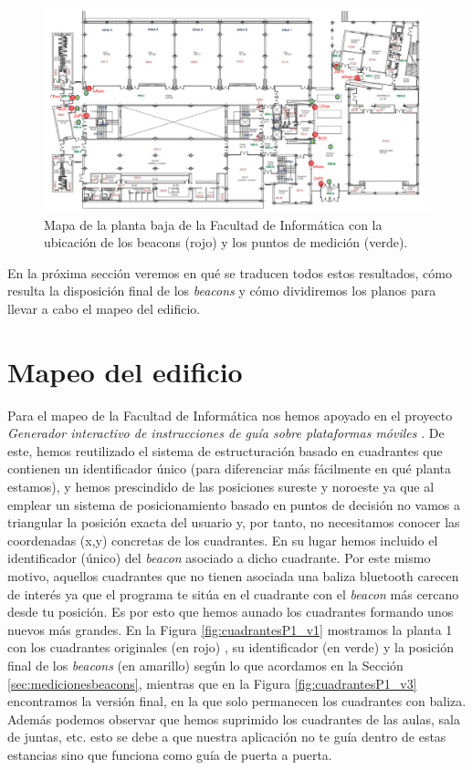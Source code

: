 \begin{figure}[t]
	\centering
	\includegraphics[width=1\textwidth]{Imagenes/Descripciondeltrabajo/medidasPlanoPBaja}
	\caption{Mapa de la planta baja de la Facultad de Informática con la ubicación de los beacons (rojo) y los puntos de medición (verde). }
	\label{fig:medidasPBaja}
\end{figure}

En la próxima sección veremos en qué se traducen todos estos resultados, cómo resulta la disposición final de los \textit{beacons} y cómo dividiremos los planos para llevar a cabo el mapeo del edificio.


\section{Mapeo del edificio}
\label{sec:mapeo}
Para el mapeo de la Facultad de Informática nos hemos apoyado en el proyecto \textit{Generador interactivo de instrucciones de guía sobre plataformas móviles} \citep{TFGguia}. De este, hemos reutilizado el sistema de estructuración basado en cuadrantes que contienen un identificador único (para diferenciar más fácilmente en qué planta estamos), y hemos prescindido de las posiciones sureste y noroeste ya que al emplear un sistema de posicionamiento basado en puntos de decisión no vamos a triangular la posición exacta del usuario y, por tanto, no necesitamos conocer las coordenadas (x,y) concretas de los cuadrantes. En su lugar hemos incluido el identificador (único) del \textit{beacon} asociado a dicho cuadrante. Por este mismo motivo, aquellos cuadrantes que no tienen asociada una baliza bluetooth carecen de interés ya que el programa te sitúa en el cuadrante con el \textit{beacon} más cercano desde tu posición. Es por esto que hemos aunado los cuadrantes formando unos nuevos más grandes. En la Figura \ref{fig:cuadrantesP1_v1} mostramos la planta 1 con los cuadrantes originales (en rojo) , su identificador (en verde) y la posición final de los \textit{beacons} (en amarillo) según lo que acordamos en la Sección \ref{sec:medicionesbeacons}, mientras que en la Figura \ref{fig:cuadrantesP1_v3} encontramos la versión final, en la que solo permanecen los cuadrantes con baliza. Además podemos observar que hemos suprimido los cuadrantes de las aulas, sala de juntas, etc. esto se debe a que nuestra aplicación no te guía dentro de estas estancias sino que funciona como guía de puerta a puerta.

